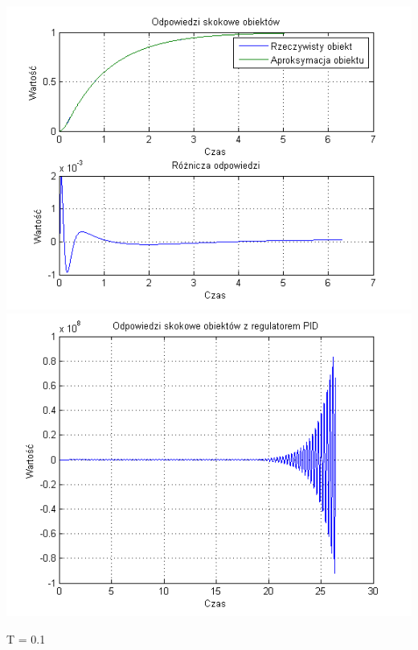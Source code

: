 \documentclass[10pt,a4paper]{article}
\begin{document}
\begin{center}
\includegraphics[scale=1]{images/dwa/skrypt_91.png}\\
\includegraphics[scale=1]{images/dwa/skrypt_92.png}\\
\end{center}
\newpage
T = 0.1
\end{document}
